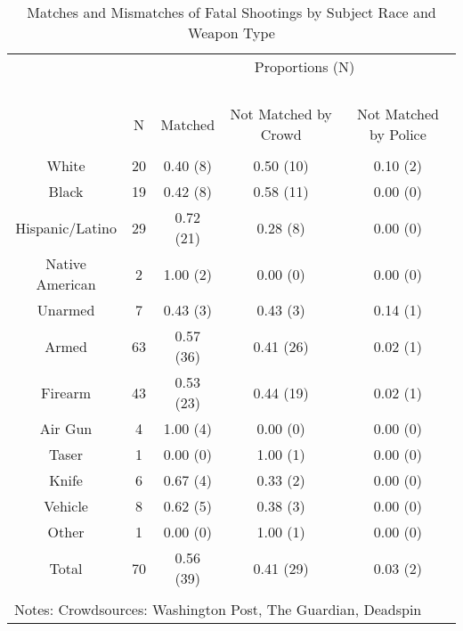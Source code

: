 
\begin{table}[!htbp] \centering 
  \caption{Matches and Mismatches of Fatal Shootings by Subject Race and Weapon Type} 
  \label{} 
\footnotesize 
\begin{tabular}{@{\extracolsep{5pt}} ccccc} 
\\[-1.8ex]\hline 
 && \multicolumn{3}{c}{Proportions (N)} \\ \cline{3-5} \\[-4.8ex]  \\
\hline \\[-1.8ex] 
\hline \\[-1.8ex] 
 & N & Matched & Not Matched by Crowd & Not Matched by Police \\ 
\hline \\[-1.8ex] 
White & 20 & 0.40 (8) & 0.50 (10) & 0.10 (2) \\ 
Black & 19 & 0.42 (8) & 0.58 (11) & 0.00 (0) \\ 
Hispanic/Latino & 29 & 0.72 (21) & 0.28 (8) & 0.00 (0) \\ 
Native American & 2 & 1.00 (2) & 0.00 (0) & 0.00 (0) \\ 
Unarmed & 7 & 0.43 (3) & 0.43 (3) & 0.14 (1) \\ 
Armed & 63 & 0.57 (36) & 0.41 (26) & 0.02 (1) \\ 
Firearm & 43 & 0.53 (23) & 0.44 (19) & 0.02 (1) \\ 
Air Gun & 4 & 1.00 (4) & 0.00 (0) & 0.00 (0) \\ 
Taser & 1 & 0.00 (0) & 1.00 (1) & 0.00 (0) \\ 
Knife & 6 & 0.67 (4) & 0.33 (2) & 0.00 (0) \\ 
Vehicle & 8 & 0.62 (5) & 0.38 (3) & 0.00 (0) \\ 
Other & 1 & 0.00 (0) & 1.00 (1) & 0.00 (0) \\ 
Total & 70 & 0.56 (39) & 0.41 (29) & 0.03 (2) \\ 
\hline \\[-1.8ex] 
\multicolumn{5}{l}{Notes: Crowdsources: Washington Post, The Guardian, Deadspin} \\ 
\end{tabular} 
\end{table}  
